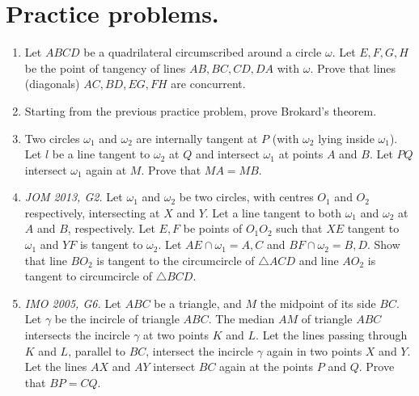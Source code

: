 \documentclass[11pt,a4paper]{article}
\begin{document}
\section {Practice problems.}
\begin {enumerate}
\item Let $ABCD$ be a quadrilateral circumscribed around a circle $\omega$. Let $E, F, G, H$ be the point of tangency of lines $AB, BC, CD, DA$ with $\omega$. Prove that lines (diagonals) $AC, BD, EG, FH$ are concurrent.
\item Starting from the previous practice problem, prove Brokard's theorem.

\item Two circles $\omega_1$ and $\omega_2$ are internally tangent at $P$ (with $\omega_2$ lying inside $\omega_1$). Let $l$ be a line tangent to $\omega_2$ at $Q$ and intersect $\omega_1$ at points $A$ and $B$. Let $PQ$ intersect $\omega_1$ again at $M$. Prove that $MA=MB.$

\item\emph {JOM 2013, G2.} Let $\omega_1$ and $\omega_2$ be two circles, with centres $O_1$ and $O_2$ respectively, intersecting at $X$ and $Y$.  Let a line tangent to both $\omega_1$ and $\omega_2$ at $A$ and $B$,  respectively.   Let $E, F$ be  points  of $O_1O_2$ such that $XE$ tangent to $\omega_1$ and $YF$ is tangent to $\omega_2$. Let $AE\cap\omega_1=A, C$ and $BF\cap\omega_2=B,D.$ Show that line $BO_2$ is tangent to the circumcircle of $\triangle ACD$ and line $AO_2$ is tangent to circumcircle of $\triangle BCD$.

\item\emph {IMO 2005, G6.} Let $ABC$ be a triangle, and $M$ the midpoint of its side $BC$. Let $\gamma$ be the incircle of triangle $ABC$. The median $AM$ of triangle $ABC$ intersects the incircle $\gamma$ at two points $K$ and $L$. Let the lines passing through $K$ and $L$, parallel to $BC$, intersect the incircle $\gamma$ again in two points $X$ and $Y$. Let the lines $AX$ and $AY$ intersect $BC$ again at the points $P$ and $Q$. Prove that $BP = CQ$.


\end{enumerate}
\end{document}
